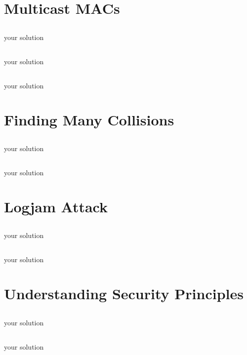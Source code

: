 \documentclass[12pt]{article}
\begin{document}
\newpage
\section{Multicast MACs}

\subsection{}
your solution

\subsection{}
your solution

\subsection{}
your solution



\newpage
\section{Finding Many Collisions}

\subsection{}
your solution

\subsection{}
your solution


\newpage
\section{Logjam Attack}

\subsection{}
your solution

\subsection{}
your solution




\newpage
\section{Understanding Security Principles}

\subsection{}
your solution

\subsection{}
your solution
\end{document}
